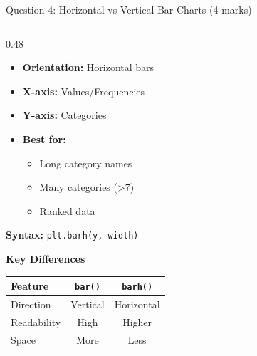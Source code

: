 \documentclass[aspectratio=169]{beamer}
\begin{document}
\begin{frame}{Question 4: Horizontal vs Vertical Bar Charts (4 marks)}
\begin{columns}[T]
\begin{column}{0.48\textwidth}
            \begin{itemize}
                \item \textbf{Orientation:} Horizontal bars
                \item \textbf{X-axis:} Values/Frequencies
                \item \textbf{Y-axis:} Categories
                \item \textbf{Best for:}
                    \begin{itemize}
                        \item Long category names
                        \item Many categories (>7)
                        \item Ranked data
                    \end{itemize}
            \end{itemize}

            \vspace{0.3cm}

            \textbf{Syntax:} \texttt{plt.barh(y, width)}

            \vspace{0.2cm}

            \textbf{Key Differences}
            \begin{table}[h]
                \centering
                \scriptsize
                \begin{tabular}{lcc}
                    \toprule
                    \textbf{Feature} & \texttt{bar()} & \texttt{barh()} \\
                    \midrule
                    Direction & Vertical & Horizontal \\
                    Readability & High & Higher \\
                    Space & More & Less \\
                    \bottomrule
                \end{tabular}
            \end{table}
        \end{column}
    \end{columns}
\end{frame}
\end{document}
